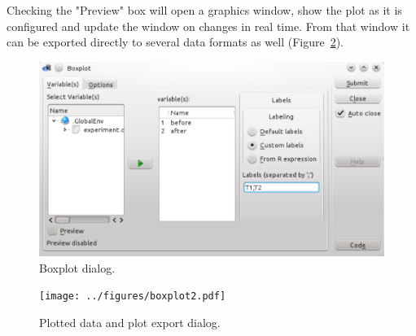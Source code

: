 Checking the "Preview" box will open a graphics window, show the plot as
it is configured and update the window on changes in real time. From
that window it can be exported directly to several data formats as
well (Figure~\ref{fig:boxplot2}).

\begin{figure}[htp]
 \centering
 \includegraphics[clip=true,width=16cm]{../figures/boxplot1.pdf}
 \caption{Boxplot dialog.}
 \label{fig:boxplot1}
\end{figure}

\begin{figure}[htp]
 \centering
 \texttt{[image: ../figures/boxplot2.pdf]}
 \caption{Plotted data and plot export dialog.}
 \label{fig:boxplot2}
\end{figure}
